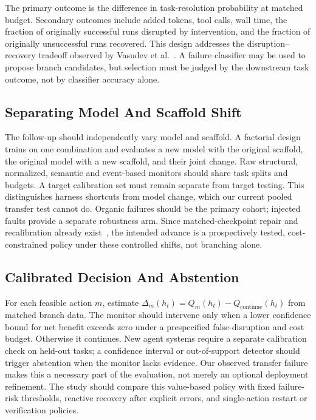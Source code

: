 The primary outcome is the difference in task-resolution probability at matched budget. Secondary outcomes include added tokens, tool calls, wall time, the fraction of originally successful runs disrupted by intervention, and the fraction of originally unsuccessful runs recovered. This design addresses the disruption--recovery tradeoff observed by Vasudev et al.~\cite{interventionparadox}. A failure classifier may be used to propose branch candidates, but selection must be judged by the downstream task outcome, not by classifier accuracy alone.

\subsection{Separating Model And Scaffold Shift}
The follow-up should independently vary model and scaffold. A factorial design trains on one combination and evaluates a new model with the original scaffold, the original model with a new scaffold, and their joint change. Raw structural, normalized, semantic and event-based monitors should share task splits and budgets. A target calibration set must remain separate from target testing. This distinguishes harness shortcuts from model change, which our current pooled transfer test cannot do. Organic failures should be the primary cohort; injected faults provide a separate robustness arm. Since matched-checkpoint repair and recalibration already exist~\cite{sentinel,dover}, the intended advance is a prospectively tested, cost-constrained policy under these controlled shifts, not branching alone.

\subsection{Calibrated Decision And Abstention}
For each feasible action $m$, estimate $\Delta_m(h_t)=Q_m(h_t)-Q_{\mathrm{continue}}(h_t)$ from matched branch data. The monitor should intervene only when a lower confidence bound for net benefit exceeds zero under a prespecified false-disruption and cost budget. Otherwise it continues. New agent systems require a separate calibration check on held-out tasks; a confidence interval or out-of-support detector should trigger abstention when the monitor lacks evidence. Our observed transfer failure makes this a necessary part of the evaluation, not merely an optional deployment refinement. The study should compare this value-based policy with fixed failure-risk thresholds, reactive recovery after explicit errors, and single-action restart or verification policies.

